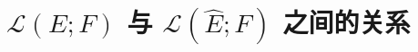 \section{\texorpdfstring{$\mathcal{L}(E;F)$}{L(E;F)} 与 \texorpdfstring{$\mathcal{L}(\hat{E};F)$}{L(Ê;F)} 之间的关系}

